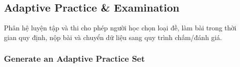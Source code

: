 \documentclass[12pt,a4paper,oneside]{report}
\begin{document}

\subsection{Adaptive Practice \& Examination}
\label{subsec:adaptive-practice-examination}

Phân hệ luyện tập và thi cho phép người học chọn loại đề, làm bài trong thời gian quy định, nộp bài và chuyển dữ liệu sang quy trình chấm/đánh giá.

\subsubsection{Generate an Adaptive Practice Set}
\label{subsubsec:generate-adaptive-practice-set}
\end{document}
